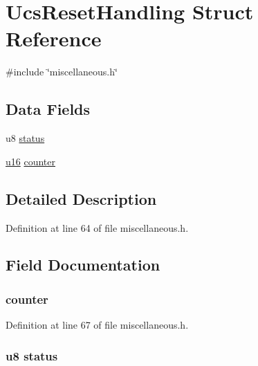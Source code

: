 \hypertarget{structUcsResetHandling}{\section{\-Ucs\-Reset\-Handling \-Struct \-Reference}
\label{structUcsResetHandling}
}


{\ttfamily \#include \char`\"{}miscellaneous.\-h\char`\"{}}

\subsection*{\-Data \-Fields}
\begin{DoxyCompactItemize}
\item 
u8 \hyperlink{structUcsResetHandling_aa648386576736be0dd25c95b6edd37d2}{status}
\item 
\hyperlink{main__ED__BM_8c_a9e6c91d77e24643b888dbd1a1a590054}{u16} \hyperlink{structUcsResetHandling_ad00d8d1e3945b2409706acf4fb49f3c1}{counter}
\end{DoxyCompactItemize}


\subsection{\-Detailed \-Description}


\-Definition at line 64 of file miscellaneous.\-h.



\subsection{\-Field \-Documentation}
\hypertarget{structUcsResetHandling_ad00d8d1e3945b2409706acf4fb49f3c1}{
\subsubsection[{counter}]{ {\bf counter}}}\label{structUcsResetHandling_ad00d8d1e3945b2409706acf4fb49f3c1}


\-Definition at line 67 of file miscellaneous.\-h.

\hypertarget{structUcsResetHandling_aa648386576736be0dd25c95b6edd37d2}{
\subsubsection[{status}]{\setlength{\rightskip}{0pt plus 5cm}u8 {\bf status}}}\label{structUcsResetHandling_aa648386576736be0dd25c95b6edd37d2}


